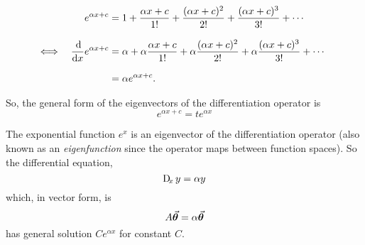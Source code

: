 \documentclass[MathsNotesBase.tex]{subfiles}
\begin{document}
{		\begin{align*}
		&& e^{\alpha x + c} &= 1 + \frac{\alpha x + c}{1!} + \frac{(\alpha x + c)^2}{2!} + \frac{(\alpha x + c)^3}{3!} + \cdots \\[8pt]
		&\iff & \frac{\dif}{\dif x} e^{\alpha x + c} &= \alpha + \alpha\frac{\alpha x + c}{1!} + \alpha\frac{(\alpha x + c)^2}{2!} + \alpha\frac{(\alpha x + c)^3}{3!} + \cdots &\sidecomment{} \\[8pt]
		&&&= \alpha e^{\alpha x + c}.
		\end{align*}
		
		So, the general form of the eigenvectors of the differentiation operator is
		\[ e^{\alpha x + c} = te^{\alpha x} \]
			
		
		\bigskip\bigskip\bigskip
		The exponential function $e^x$ is an eigenvector of the differentiation operator (also known as an \textit{eigenfunction} since the operator maps between function spaces). So the differential equation,
		\begin{equation}
			\Dif_x y = \alpha y
		\end{equation}
		which, in vector form, is
		\begin{equation}
			A\vec{\bm{\theta}} = \alpha \vec{\bm{\theta}}
		\end{equation}
		has general solution $Ce^{\alpha x}$ for constant $C$.
	}



\end{document}
